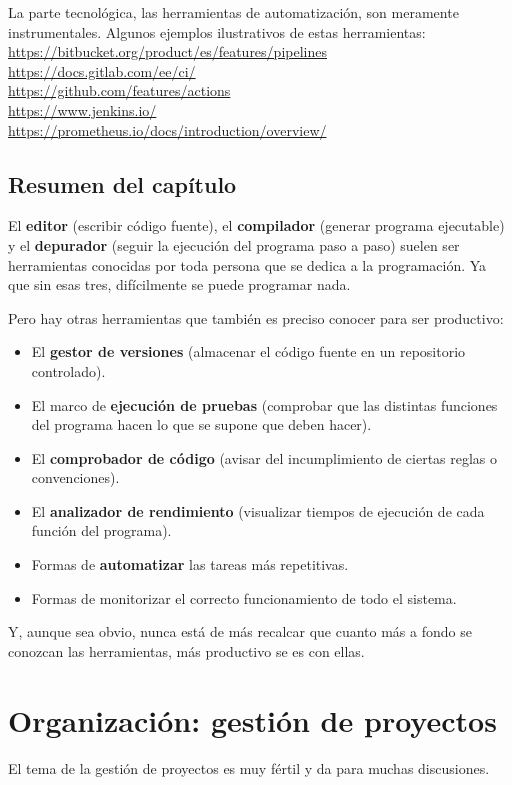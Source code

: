 \documentclass[spanish,12pt,a4paper,final,oneside]{book}
\begin{document}
La parte tecnológica, las herramientas de automatización, son meramente instrumentales. Algunos ejemplos ilustrativos de estas herramientas:
\\ \url{https://bitbucket.org/product/es/features/pipelines}
\\ \url{https://docs.gitlab.com/ee/ci/}
\\ \url{https://github.com/features/actions}
\\ \url{https://www.jenkins.io/}
\\ \url{https://prometheus.io/docs/introduction/overview/}


\section*{Resumen del capítulo}
El \textbf{editor} (escribir código fuente), el \textbf{compilador} (generar programa ejecutable) y el \textbf{depurador} (seguir la ejecución del programa paso a paso) suelen ser herramientas conocidas por toda persona que se dedica a la programación. Ya que sin esas tres, difícilmente se puede programar nada.

Pero hay otras herramientas que también es preciso conocer para ser productivo:
\begin{itemize}
\item El \textbf{gestor de versiones} (almacenar el código fuente en un repositorio controlado).
\item El marco de \textbf{ejecución de pruebas} (comprobar que las distintas funciones del programa hacen lo que se supone que deben hacer).
\item El \textbf{comprobador de código} (avisar del incumplimiento de ciertas reglas o convenciones).
\item El \textbf{analizador de rendimiento} (visualizar tiempos de ejecución de cada función del programa).
\item Formas de \textbf{automatizar} las tareas más repetitivas.
\item Formas de monitorizar el correcto funcionamiento de todo el sistema.
\end{itemize}

Y, aunque sea obvio, nunca está de más recalcar que cuanto más a fondo se conozcan las herramientas, más productivo se es con ellas.




\chapter{Organización: gestión de proyectos}
El tema de la gestión de proyectos es muy fértil y da para muchas discusiones.
\end{document}
